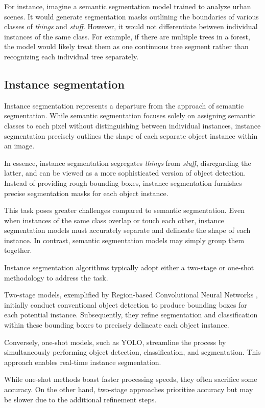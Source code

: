 For instance, imagine a semantic segmentation model trained to analyze urban scenes. It would generate segmentation masks outlining the boundaries of various classes of \textit{things} and \textit{stuff}. However, it would not differentiate between individual instances of the same class. For example, if there are multiple trees in a forest, the model would likely treat them as one continuous tree segment rather than recognizing each individual tree separately.

\subsection{Instance segmentation}
Instance segmentation represents a departure from the approach of semantic segmentation. While semantic segmentation focuses solely on assigning semantic classes to each pixel without distinguishing between individual instances, instance segmentation precisely outlines the shape of each separate object instance within an image.

In essence, instance segmentation segregates \textit{things} from \textit{stuff}, disregarding the latter, and can be viewed as a more sophisticated version of object detection. Instead of providing rough bounding boxes, instance segmentation furnishes precise segmentation masks for each object instance.

This task poses greater challenges compared to semantic segmentation. Even when instances of the same class overlap or touch each other, instance segmentation models must accurately separate and delineate the shape of each instance. In contrast, semantic segmentation models may simply group them together.

Instance segmentation algorithms typically adopt either a two-stage or one-shot methodology to address the task.

Two-stage models, exemplified by Region-based Convolutional Neural Networks \cite{RCNN2014}, initially conduct conventional object detection to produce bounding boxes for each potential instance. Subsequently, they refine segmentation and classification within these bounding boxes to precisely delineate each object instance.

Conversely, one-shot models, such as YOLO, streamline the process by simultaneously performing object detection, classification, and segmentation. This approach enables real-time instance segmentation.

While one-shot methods boast faster processing speeds, they often sacrifice some accuracy. On the other hand, two-stage approaches prioritize accuracy but may be slower due to the additional refinement steps.

